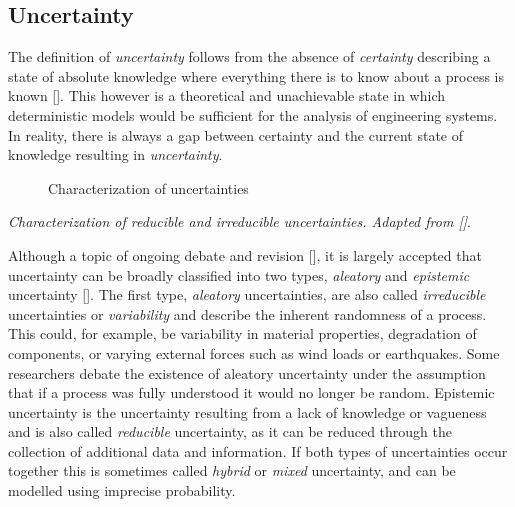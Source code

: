 \label{16879307210612674453}{}


\subsection{Uncertainty}



\label{10991333852424530659}{}


The definition of \emph{uncertainty} follows from the absence of \emph{certainty} describing a state of absolute knowledge where everything there is to know about a process is known []. This however is a theoretical and unachievable state in which deterministic models would be sufficient for the analysis of engineering systems. In reality, there is always a gap between certainty and the current state of knowledge resulting in \emph{uncertainty}.



\begin{figure}
\centering
{}
\caption{Characterization of uncertainties}
\end{figure}
 \emph{Characterization of reducible and irreducible uncertainties. Adapted from []}.



Although a topic of ongoing debate and revision [], it is largely accepted that uncertainty can be broadly classified into two types, \emph{aleatory} and \emph{epistemic} uncertainty []. The first type, \emph{aleatory} uncertainties, are also called \emph{irreducible} uncertainties or \emph{variability} and describe the inherent randomness of a process. This could, for example, be variability in material properties, degradation of components, or varying external forces such as wind loads or earthquakes. Some researchers debate the existence of aleatory uncertainty under the assumption that if a process was fully understood it would no longer be random. Epistemic uncertainty is the uncertainty resulting from a lack of knowledge or vagueness and is also called \emph{reducible} uncertainty, as it can be reduced through the collection of additional data and information. If both types of uncertainties occur together this is sometimes called \emph{hybrid} or \emph{mixed} uncertainty, and can be modelled using imprecise probability.



